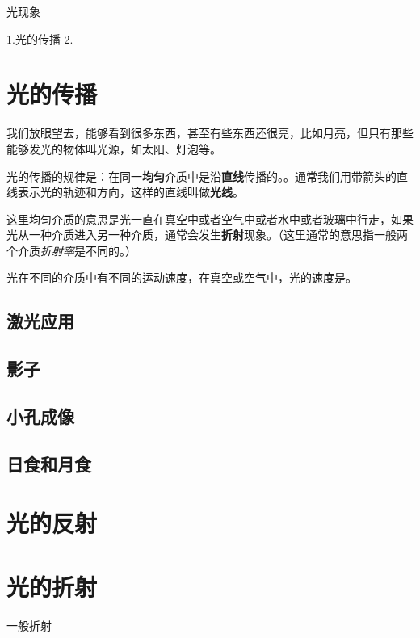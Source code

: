 \documentclass[12pt]{exam}
\newcommand{\keti}{光现象}
\newcommand{\zhongdian}{1.光的传播 2.}
\begin{document}
\vspace*{80pt}
\keti \par
\zhongdian \par
\section{光的传播}
我们放眼望去，能够看到很多东西，甚至有些东西还很亮，比如月亮，但只有那些能够发光的物体叫光源，如太阳、灯泡等。

光的传播的规律是：在同一\textbf{均匀}介质中是沿\textbf{直线}传播的。。通常我们用带箭头的直线表示光的轨迹和方向，这样的直线叫做\textbf{光线}。

这里均匀介质的意思是光一直在真空中或者空气中或者水中或者玻璃中行走，如果光从一种介质进入另一种介质，通常会发生\textbf{折射}现象。（这里通常的意思指一般两个介质\textit{折射率}是不同的。）

光在不同的介质中有不同的运动速度，在真空或空气中，光的速度是。




\subsection{激光应用}


\subsection{影子}



\subsection{小孔成像}


\subsection{日食和月食}




\section{光的反射}



\section{光的折射}
一般折射
\end{document}
